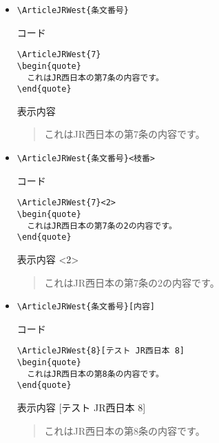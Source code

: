 \documentclass[oneside,10pt,a4paper]{jsarticle}
\begin{document}
  \begin{itemize}
    \item \verb|\ArticleJRWest{条文番号}|
      \begin{itembox}[l]{コード}
        {\footnotesize\begin{verbatim}
\ArticleJRWest{7}
\begin{quote}
  これはJR西日本の第7条の内容です。
\end{quote}\end{verbatim}}
      \end{itembox}
      \begin{itembox}[l]{表示内容}
        \begin{quote}
          これはJR西日本の第7条の内容です。
        \end{quote}
      \end{itembox}
    \item \verb|\ArticleJRWest{条文番号}<枝番>|
      \begin{itembox}[l]{コード}
        {\footnotesize\begin{verbatim}
\ArticleJRWest{7}<2>
\begin{quote}
  これはJR西日本の第7条の2の内容です。
\end{quote}\end{verbatim}}
      \end{itembox}
      \begin{itembox}[l]{表示内容}
        <2>
        \begin{quote}
          これはJR西日本の第7条の2の内容です。
        \end{quote}
      \end{itembox}
    \newpage
    \item \verb|\ArticleJRWest{条文番号}[内容]|
      \begin{itembox}[l]{コード}
        {\footnotesize\begin{verbatim}
\ArticleJRWest{8}[テスト JR西日本 8]
\begin{quote}
  これはJR西日本の第8条の内容です。
\end{quote}\end{verbatim}}
      \end{itembox}
      \begin{itembox}[l]{表示内容}
        [テスト JR西日本 8]
        \begin{quote}
          これはJR西日本の第8条の内容です。
        \end{quote}
      \end{itembox}

\end{itemize}
\end{document}
